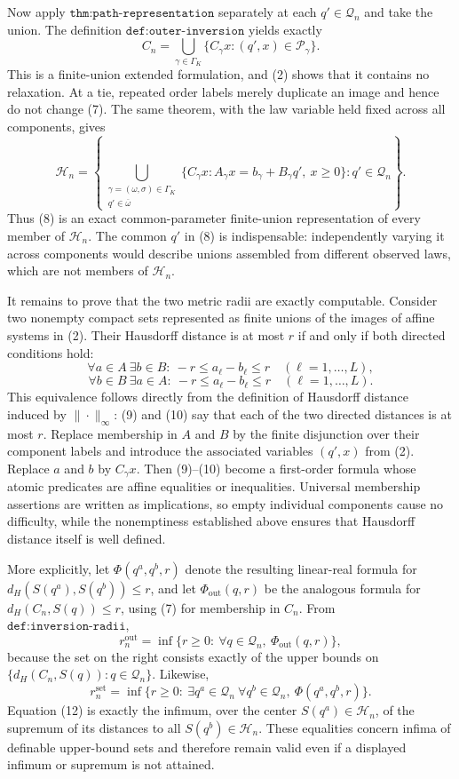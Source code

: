 Now apply \(\texttt{thm:path-representation}\) separately at each \(q'\in\mathcal Q_n\) and take the union.  The definition \(\texttt{def:outer-inversion}\) yields exactly
\[
 C_n
 =\bigcup_{\gamma\in\Gamma_K}
   \{C_\gamma x:(q',x)\in\mathcal P_\gamma\}.
 \tag{7}
\]
This is a finite-union extended formulation, and (2) shows that it contains no relaxation.  At a tie, repeated order labels merely duplicate an image and hence do not change (7).  The same theorem, with the law variable held fixed across all components, gives
\[
 \mathcal H_n
 =\left\{
   \bigcup_{\substack{\gamma=(\omega,\sigma)\in\Gamma_K\\q'\in\overline\omega}}
   \{C_\gamma x:A_\gamma x=b_\gamma+B_\gamma q',\ x\geq0\}
   :q'\in\mathcal Q_n
 \right\}.
 \tag{8}
\]
Thus (8) is an exact common-parameter finite-union representation of every member of \(\mathcal H_n\).  The common \(q'\) in (8) is indispensable: independently varying it across components would describe unions assembled from different observed laws, which are not members of \(\mathcal H_n\).

It remains to prove that the two metric radii are exactly computable.  Consider two nonempty compact sets represented as finite unions of the images of affine systems in (2).  Their Hausdorff distance is at most \(r\) if and only if both directed conditions hold:
\[
 \forall a\in A\ \exists b\in B:\ -r\leq a_\ell-b_\ell\leq r
       \quad(\ell=1,\ldots,L),
 \tag{9}
\]
\[
 \forall b\in B\ \exists a\in A:\ -r\leq a_\ell-b_\ell\leq r
       \quad(\ell=1,\ldots,L).
 \tag{10}
\]
This equivalence follows directly from the definition of Hausdorff distance induced by \(\|\cdot\|_\infty\): (9) and (10) say that each of the two directed distances is at most \(r\).  Replace membership in \(A\) and \(B\) by the finite disjunction over their component labels and introduce the associated variables \((q',x)\) from (2).  Replace \(a\) and \(b\) by \(C_\gamma x\).  Then (9)--(10) become a first-order formula whose atomic predicates are affine equalities or inequalities.  Universal membership assertions are written as implications, so empty individual components cause no difficulty, while the nonemptiness established above ensures that Hausdorff distance itself is well defined.

More explicitly, let \(\Phi(q^a,q^b,r)\) denote the resulting linear-real formula for
\(d_H(S(q^a),S(q^b))\leq r\), and let \(\Phi_{\mathrm{out}}(q,r)\) be the analogous formula for \(d_H(C_n,S(q))\leq r\), using (7) for membership in \(C_n\).  From \(\texttt{def:inversion-radii}\),
\[
 r_n^{\mathrm{out}}
 =\inf\{r\geq0:\ \forall q\in\mathcal Q_n,\ \Phi_{\mathrm{out}}(q,r)\},
 \tag{11}
\]
because the set on the right consists exactly of the upper bounds on
\(\{d_H(C_n,S(q)):q\in\mathcal Q_n\}\).  Likewise,
\[
 r_n^{\mathrm{set}}
 =\inf\{r\geq0:\ \exists q^a\in\mathcal Q_n\ \forall q^b\in\mathcal Q_n,
                      \ \Phi(q^a,q^b,r)\}.
 \tag{12}
\]
Equation (12) is exactly the infimum, over the center \(S(q^a)\in\mathcal H_n\), of the supremum of its distances to all \(S(q^b)\in\mathcal H_n\).  These equalities concern infima of definable upper-bound sets and therefore remain valid even if a displayed infimum or supremum is not attained.

